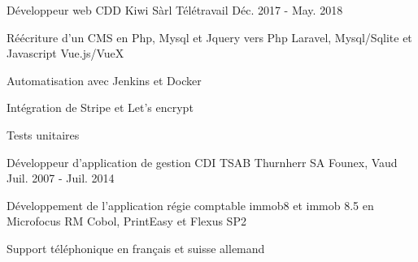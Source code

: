 

\begin{cventries}

  \cventry
    {Développeur web CDD} %
    {Kiwi Sàrl} %
    {Télétravail} %
    {Déc. 2017 - May. 2018} %
    {
      \begin{cvitems} %
        \item {Réécriture d'un CMS en Php, Mysql et Jquery vers Php Laravel, Mysql/Sqlite et Javascript Vue.js/VueX}
        \item {Automatisation avec Jenkins et Docker}
        \item {Intégration de Stripe et Let's encrypt}
        \item {Tests unitaires}
      \end{cvitems}
    }

  \cventry
    {Développeur d'application de gestion CDI} %
    {TSAB Thurnherr SA} %
    {Founex, Vaud} %
    {Juil. 2007 - Juil. 2014} %
    {
      \begin{cvitems} %
        \item {Développement de l'application régie comptable immob8 et immob 8.5 en Microfocus RM Cobol, PrintEasy et Flexus SP2}
        \item {Support téléphonique en français et suisse allemand}
      \end{cvitems}
    }

\end{cventries}
